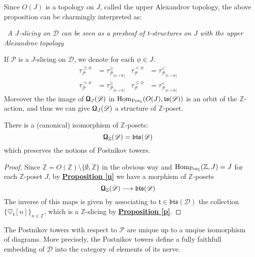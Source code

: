 Since $O(J)$ is a topology on $J$, called the upper Alexandrov topology, the above proposition can be charmingly interpreted as: 
\begin{center}
\twonotes \ \textit{A $J$-slicing on $\mathscr{D}$ can be seen as a presheaf of t-structures on $J$ with the upper Alexandrov topology}
\end{center}
If $\mathscr{P}$ is a $J$-slicing on $\mathscr{D}$, we denote for each $\phi \in J$: 
\begin{align*} 
\tau^{\ge \phi}_{\mathscr{P}}&=\tau^{\ge}_{\mathscr{P}_{[\phi, + \infty[}} &  \tau^{< \phi}_{\mathscr{P}}&=\tau^{<}_{\mathscr{P}_{[\phi, + \infty[}} \\  \tau^{> \phi}_{\mathscr{P}}&=\tau^{\ge}_{\mathscr{P}_{]\phi, + \infty[}} &  \tau^{\le \phi}_{\mathscr{P}}&=\tau^{<}_{\mathscr{P}_{]\phi, + \infty[}}
\end{align*} 
Moreover the the image of $\textnormal{\Libra}_J(\mathscr{D})$ in $\textnormal{Hom}_{\textnormal{Pos}_{\mathbb{Z}}}(O(J), \mathfrak{ts}(\mathscr{D}))$ is an orbit of the $\mathbb{Z}$-action, and thus we can give $\textnormal{\Libra}_J(\mathscr{D})$ a structure of $\mathbb{Z}$-poset. \\

\begin{prop}\label{ae}
There is a (canonical) isomorphism of $\mathbb{Z}$-posets: $$\textnormal{\Libra}_{\mathbb{Z}}(\mathscr{D})=\mathfrak{bts}(\mathscr{D})$$
which preserves the notions of Postnikov towers. 
\end{prop}

\begin{proof}
Since $\mathbb{Z}=O(\mathbb{Z}) \setminus \{ \emptyset, \mathbb{Z} \}$ in the obvious way and $\textnormal{Hom}_{\textnormal{Pos}_{\mathbb{Z}}}(\mathbb{Z},J)=J$ for each $\mathbb{Z}$-poset $J$, by \hyperref[u]{\textbf{Proposition \ref*{u}}} we have a morphism of $\mathbb{Z}$-posets $$\textnormal{\Libra}_{\mathbb{Z}}(\mathscr{D}) \longrightarrow \mathfrak{bts}(\mathscr{D})$$
The inverse of this maps is given by associating to $\mathfrak{t} \in \mathfrak{bts}(\mathscr{D})$ the collection $\{ \heartsuit_{\mathfrak{t}}[n] \}_{n \in \mathbb{Z}}$, which is a $\mathbb{Z}$-slicing by \hyperref[p]{\textbf{Proposition \ref*{p}}}. 
\end{proof}

\begin{prop}
The Postnikov towers with respect to $\mathscr{P}$ are unique up to a unqiue isomorphism of diagrams. More precisely, the Postnikov towers define a fully faithfull embedding of $\mathscr{D}$ into the category of elements of its nerve. 
\end{prop}

